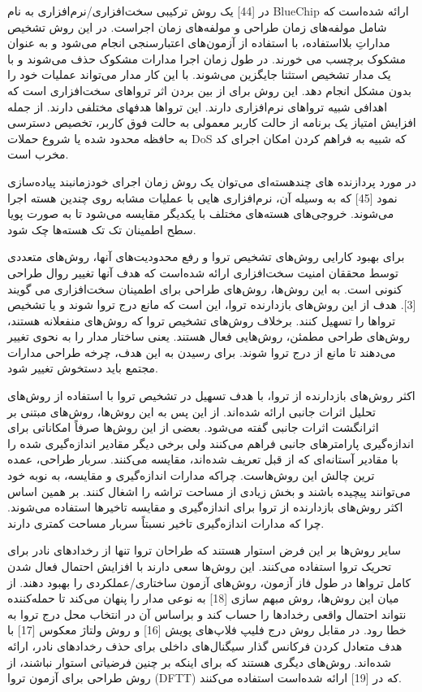در [44] یک روش ترکیبی سخت‌افزاری/نرم‌افزاری به نام BlueChip ارائه شده‌است که شامل مولفه‌های زمان طراحی  و مولفه‌های زمان اجراست. در این روش تشخیص مداراتِ بلااستفاده، با استفاده از آزمون‌های اعتبارسنجی انجام می‌شود و به عنوان مشکوک برچسب می خورند. در طول زمان اجرا مدارات مشکوک حذف می‌شوند و با یک مدار تشخیص استثنا جایگزین می‌شوند. با این کار مدار می‌تواند عملیات خود را بدون مشکل انجام دهد. این روش برای از بین بردن اثر تروا‌های سخت‌افزاری است که اهدافی شبیه تروا‌های نرم‌افزاری دارند. این تروا‌ها هدفهای مختلفی دارند. از جمله افزایش امتیاز یک برنامه از حالت کاربر معمولی به حالت فوق کاربر، تخصیص دسترسی به حافظه محدود شده یا شروع حملات DoS که شبیه به فراهم کردن امکان اجرای کد مخرب است.

در مورد پردازنده های چندهسته‌ای می‌توان یک روش زمان اجرای خودزمانبند پیاده‌سازی نمود [45] که به وسیله آن، نرم‌افزاری هایی با عملیات مشابه روی چندین هسته اجرا می‌شوند. خروجی‌های هسته‌های مختلف با یکدیگر مقایسه می‌شود تا به صورت پویا سطح اطمینان تک تک هسته‌ها چک شود.

برای بهبود کارایی روش‌های تشخیص تروا و رفع محدودیت‌های آنها، روش‌های متعددی توسط محققان امنیت سخت‌افزاری ارائه شده‌است که هدف آنها تغییر روال طراحی کنونی است. به این روش‌ها، روش‌های طراحی برای اطمینان سخت‌افزاری می گویند [3]. هدف از این روش‌های بازدارنده تروا، این است که مانع درج تروا  شوند و یا تشخیص تروا‌ها را تسهیل کنند. برخلاف روش‌های تشخیص تروا که روش‌های منفعلانه هستند، روش‌های طراحی مطمئن، روش‌هایی فعال هستند. یعنی ساختار مدار را به نحوی تغییر می‌دهند تا مانع از درج تروا شوند. برای رسیدن به این هدف، چرخه طراحی مدارات مجتمع باید دستخوش تغییر شود.

اکثر روش‌های بازدارنده از تروا، با هدف تسهیل در تشخیص تروا با استفاده از روش‌های تحلیل اثرات جانبی  ارائه شده‌اند. از این پس به این روش‌ها، روش‌های مبتنی بر اثرانگشت اثرات جانبی گفته می‌شود. بعضی از این روش‌ها صرفاً امکاناتی برای اندازه‌گیری پارامترهای جانبی فراهم می‌کنند ولی برخی دیگر مقادیر اندازه‌گیری شده را با مقادیر آستانه‌ای که از قبل تعریف شده‌اند، مقایسه می‌کنند. سربار طراحی، عمده ترین چالش این روش‌هاست. چراکه مدارات اندازه‌گیری و مقایسه، به نوبه خود می‌توانند پیچیده باشند و بخش زیادی از مساحت تراشه را اشغال کنند. بر همین اساس اکثر روش‌های بازدارنده از تروا برای اندازه‌گیری و مقایسه تاخیرها استفاده می‌شوند. چرا که مدارات اندازه‌گیری تاخیر نسبتاً سربار مساحت کمتری دارند.

سایر روش‌ها بر این فرض استوار هستند که طراحان تروا تنها از رخدادهای نادر برای تحریک تروا استفاده می‌کنند. این روش‌ها سعی دارند با افزایش احتمال فعال شدن کامل تروا‌ها در طول فاز آزمون، روش‌های آزمون ساختاری/عملکردی را بهبود دهند. از میان این روش‌ها، روش مبهم سازی [18] به نوعی مدار را پنهان می‌کند تا حمله‌کننده نتواند احتمال واقعی رخدادها را حساب کند و براساس آن در انتخاب محل درج تروا به خطا رود. در مقابل روش درج فلیپ فلاپ‌های پویش [16] و روش ولتاژ معکوس [17] با هدف متعادل کردن فرکانس گذار سیگنال‌های داخلی برای حذف رخدادهای نادر، ارائه شده‌اند. روش‌های دیگری هستند که برای اینکه بر چنین فرضیاتی استوار نباشند، از روش طراحی برای آزمون تروا  (DFTT) که در [19] ارائه شده‌است استفاده می‌کنند.

